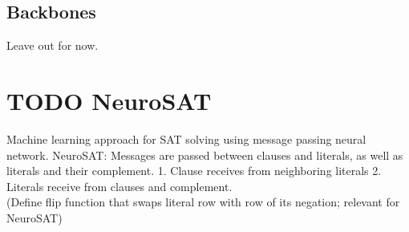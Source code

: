 \subsection{Backbones}
Leave out for now.

\section{TODO NeuroSAT}
Machine learning approach for SAT solving using message passing neural network.
NeuroSAT: Messages are passed between clauses and literals, as well as literals and their complement. 1. Clause receives from neighboring literals 2. Literals receive from clauses and complement. \\
(Define flip function that swaps literal row with row of its negation; relevant for NeuroSAT)